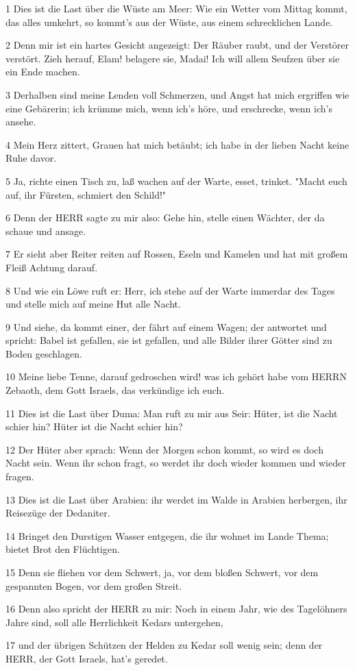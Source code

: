 \par 1 Dies ist die Last über die Wüste am Meer: Wie ein Wetter vom Mittag kommt, das alles umkehrt, so kommt's aus der Wüste, aus einem schrecklichen Lande.
\par 2 Denn mir ist ein hartes Gesicht angezeigt: Der Räuber raubt, und der Verstörer verstört. Zieh herauf, Elam! belagere sie, Madai! Ich will allem Seufzen über sie ein Ende machen.
\par 3 Derhalben sind meine Lenden voll Schmerzen, und Angst hat mich ergriffen wie eine Gebärerin; ich krümme mich, wenn ich's höre, und erschrecke, wenn ich's ansehe.
\par 4 Mein Herz zittert, Grauen hat mich betäubt; ich habe in der lieben Nacht keine Ruhe davor.
\par 5 Ja, richte einen Tisch zu, laß wachen auf der Warte, esset, trinket. "Macht euch auf, ihr Fürsten, schmiert den Schild!"
\par 6 Denn der HERR sagte zu mir also: Gehe hin, stelle einen Wächter, der da schaue und ansage.
\par 7 Er sieht aber Reiter reiten auf Rossen, Eseln und Kamelen und hat mit großem Fleiß Achtung darauf.
\par 8 Und wie ein Löwe ruft er: Herr, ich stehe auf der Warte immerdar des Tages und stelle mich auf meine Hut alle Nacht.
\par 9 Und siehe, da kommt einer, der fährt auf einem Wagen; der antwortet und spricht: Babel ist gefallen, sie ist gefallen, und alle Bilder ihrer Götter sind zu Boden geschlagen.
\par 10 Meine liebe Tenne, darauf gedroschen wird! was ich gehört habe vom HERRN Zebaoth, dem Gott Israels, das verkündige ich euch.
\par 11 Dies ist die Last über Duma: Man ruft zu mir aus Seir: Hüter, ist die Nacht schier hin? Hüter ist die Nacht schier hin?
\par 12 Der Hüter aber sprach: Wenn der Morgen schon kommt, so wird es doch Nacht sein. Wenn ihr schon fragt, so werdet ihr doch wieder kommen und wieder fragen.
\par 13 Dies ist die Last über Arabien: ihr werdet im Walde in Arabien herbergen, ihr Reisezüge der Dedaniter.
\par 14 Bringet den Durstigen Wasser entgegen, die ihr wohnet im Lande Thema; bietet Brot den Flüchtigen.
\par 15 Denn sie fliehen vor dem Schwert, ja, vor dem bloßen Schwert, vor dem gespannten Bogen, vor dem großen Streit.
\par 16 Denn also spricht der HERR zu mir: Noch in einem Jahr, wie des Tagelöhners Jahre sind, soll alle Herrlichkeit Kedars untergehen,
\par 17 und der übrigen Schützen der Helden zu Kedar soll wenig sein; denn der HERR, der Gott Israels, hat's geredet.

